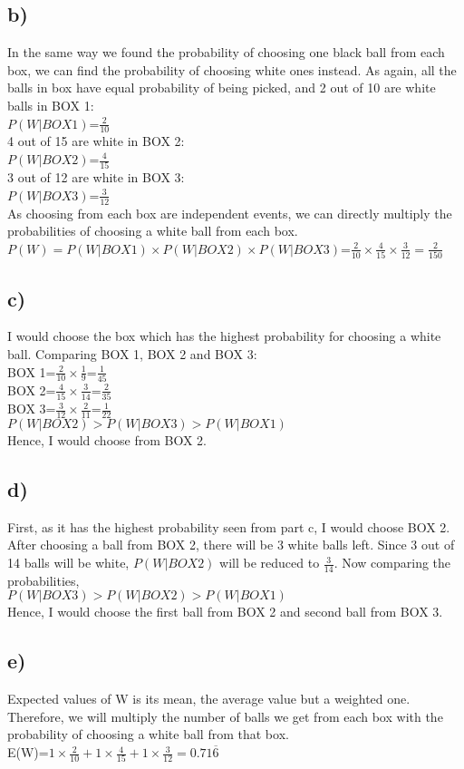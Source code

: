 \documentclass[12pt]{article}
\begin{document}
\subsection*{b)}
In the same way we found the probability of choosing one black ball from each box, we can find the probability of choosing white ones instead.
As again, all the balls in box have equal probability of being picked, and 2 out of 10 are white balls in BOX 1:\\
$P(W|BOX1)$=$\frac{2}{10}$\\
4 out of 15 are white in BOX 2:\\
$P(W|BOX2)$=$\frac{4}{15}$\\
3 out of 12 are white in BOX 3:\\
$P(W|BOX3)$=$\frac{3}{12}$\\
As choosing from each box are independent events, we can directly multiply the probabilities of choosing a white ball from each box.\\
$P(W)=P(W|BOX1)\times P(W|BOX2) \times P(W|BOX3)$=$\frac{2}{10} \times \frac{4}{15} \times \frac{3}{12}=\frac{2}{150}$\\
\subsection*{c)}
I would choose the box which has the highest probability for choosing a white ball. Comparing BOX 1, BOX 2 and BOX 3:\\
BOX 1=$\frac{2}{10} \times \frac{1}{9}$=$\frac{1}{45}$ \\
BOX 2=$\frac{4}{15} \times \frac{3}{14}$=$\frac{2}{35}$ \\
BOX 3=$\frac{3}{12} \times \frac{2}{11}$=$\frac{1}{22}$ \\
$P(W|BOX2)>P(W|BOX3)>P(W|BOX1)$\\
Hence, I would choose from BOX 2.\\
\subsection*{d)}
First, as it has the highest probability seen from part c, I would choose BOX 2. After choosing a ball from BOX 2, there will be 3 white balls left. Since 3 out of 14 balls will be white, $P(W|BOX2)$ will be reduced to $\frac{3}{14}$. Now comparing the probabilities, \\
$P(W|BOX3)>P(W|BOX2)>P(W|BOX1)$\\
Hence, I would choose the first ball from BOX 2 and second ball from BOX 3.
\subsection*{e)}
Expected values of W is its mean, the average value but a weighted one.\\
Therefore, we will multiply the number of balls we get from each box with the probability of choosing a white ball from that box.\\
E(W)=$1 \times \frac{2}{10} + 1 \times \frac{4}{15} + 1 \times \frac{3}{12}=0.71\overline{6}$\\
\end{document}
